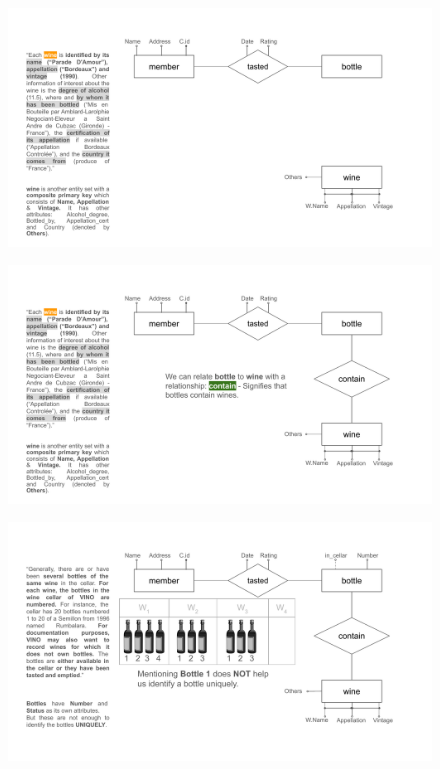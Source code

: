 \documentclass{beamer}
\begin{document}
\begin{frame}
    \begin{figure}
        \centering
        \includegraphics[width=1.1\linewidth]{tut_02_files/04.pdf}
    \end{figure}
\end{frame}

\begin{frame}
    \begin{figure}
        \centering
        \includegraphics[width=1.1\linewidth]{tut_02_files/05.pdf}
    \end{figure}
\end{frame}

\begin{frame}
    \begin{figure}
        \centering
        \includegraphics[width=1.1\linewidth]{tut_02_files/06.pdf}
    \end{figure}
\end{frame}
\end{document}
